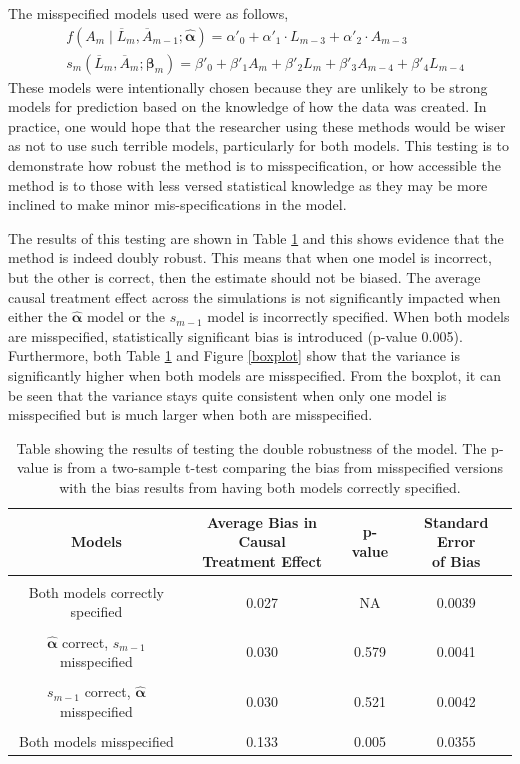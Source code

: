 The misspecified models used were as follows, 
\begin{align} 
&f(A_m \mid \overline{L}_m, \overline{A}_{m-1}; \hat{\mathbf{\alpha}}) = \alpha'_{0} + \alpha'_{1} \cdot L_{m-3} + \alpha'_{2} \cdot A_{m-3} \\ 
&s_{m}(\overline{L}_{m}, \overline{A}_{m};\mathbf{\beta}_{m}) = \beta'_0 + \beta'_1 A_{m} +\beta'_2 L_m  +\beta'_3 A_{m-4} +  \beta'_4 L_{m-4} 
 \end{align} 
These models were intentionally chosen because they are unlikely to be strong models for prediction based on the knowledge of how the data was created.  In practice, one would hope that the researcher using these methods would be wiser as not to use such terrible models, particularly for both models.  This testing is to demonstrate how robust the method is to misspecification, or how accessible the method is to those with less versed statistical knowledge as they may be more inclined to make minor mis-specifications in the model.  

The results of this testing are shown in Table \ref{doubletest} and this shows evidence that the method is indeed doubly robust.  This means that when one model is incorrect, but the other is correct, then the estimate should not be biased.  The average causal treatment effect across the simulations is not significantly impacted when either the $\hat{\mathbf{\alpha}}$ model or the $s_{m-1}$ model is incorrectly specified.  When both models are misspecified, statistically significant bias is introduced (p-value 0.005).  Furthermore, both Table \ref{doubletest} and Figure \ref{boxplot} show that the variance is significantly higher when both models are misspecified.  From the boxplot, it can be seen that the variance stays quite consistent when only one model is misspecified but is much larger when both are misspecified.  


\begin{table}[h!]
\centering
\begin{tabular} {c | c  c c}
Models & \shortstack{Average Bias in Causal \\ Treatment Effect} & p-value & \shortstack{Standard Error\\ of Bias} \\ 
\hline  \\
Both models correctly specified &0.027 & NA  & 0.0039\\ \\
$\hat{\mathbf{\alpha}}$ correct, $s_{m-1}$ misspecified & 0.030 & 0.579 & 0.0041\\ \\
$s_{m-1}$ correct, $\hat{\mathbf{\alpha}}$ misspecified& 0.030 & 0.521 &0.0042 \\ \\
Both models misspecified & 0.133 & 0.005 & 0.0355 
\end{tabular} \\
\centering
\caption[Testing double robustness]{Table showing the results of testing the double robustness of the model.  The p-value is from a two-sample t-test comparing the bias from misspecified versions with the bias results from having both models correctly specified. \label{doubletest}}
\end{table}

